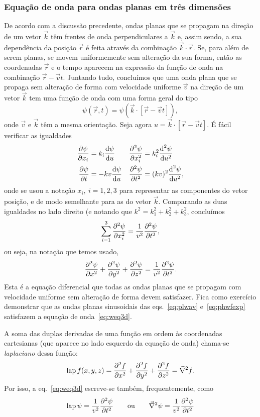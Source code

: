 \subsubsection{Equação de onda para ondas planas em três dimensões}
De acordo com a discussão precedente, ondas planas que se propagam na direção de
um vetor $\vec k$ têm frentes de onda perpendiculares a $\vec k$ e, assim sendo,
a sua dependência da posição $\vec r$ é feita através da combinação $\vec
k\cdot\vec r$. Se, para além de serem planas, se movem uniformemente sem
alteração da sua forma, então as coordenadas $\vec r$ e o tempo aparecem na
expressão da função de onda na combinação $\vec r-\vec vt$. Juntando tudo,
concluímos que uma onda plana que se propaga sem alteração de forma com
velocidade uniforme $\vec v$ na direção de um vetor $\vec k$ tem uma função de
onda com uma forma geral do tipo
\begin{equation}\label{eq:gpwwf}
  \psi(\vec r,t)=\psi\left(\vec k\cdot[\vec r-\vec vt]\right),
\end{equation}
onde $\vec v$ e $\vec k$ têm a mesma orientação. Seja agora $u=\vec k\cdot[\vec
r-\vec vt]$. É fácil verificar as igualdades
\begin{align*}
  \frac{\partial \psi}{\partial x_i}&=k_i\frac{\text{d} \psi}{\text{d} u}&
  \frac{\partial^2 \psi}{\partial x_i^2}&=k_i^2\frac{\text{d}^2 \psi}{\text{d} u^2}\\
  \frac{\partial \psi}{\partial t}&=-kv\frac{\text{d} \psi}{\text{d} u}&
  \frac{\partial^2 \psi}{\partial t^2}&=(kv)^2\frac{\text{d}^2 \psi}{\text{d} u^2},
\end{align*}
onde se usou a notação $x_i,\ i=1,2,3$ para representar as componentes do vetor
posição, e de modo semelhante para as do vetor $\vec k$. Comparando as duas
igualdades no lado direito (e notando que $k^2=k_1^2+k_2^2+k_3^2$, concluímos
\begin{equation*}
  \sum_{i=1}^3\frac{\partial^2 \psi}{\partial x_i^2}=\frac{1}{v^2}\frac{\partial^2 \psi}{\partial t^2},
\end{equation*}
ou seja, na notação que temos usado,
\begin{equation}\label{eq:weq3d}
  \frac{\partial^2 \psi}{\partial x^2}+\frac{\partial^2 \psi}{\partial y^2}+\frac{\partial^2 \psi}{\partial z^2}=\frac{1}{v^2}\frac{\partial^2 \psi}{\partial t^2}.
\end{equation}
Esta é a equação diferencial que todas as ondas planas que se propagam com
velocidade uniforme sem alteração de forma devem satisfazer. Fica como exercício
demonstrar que as ondas planas sinusoidais das eqs.~\eqref{eq:plwav}
e~\eqref{eq:phwfexp} satisfazem a equação de onda~\eqref{eq:weq3d}.

A soma das duplas derivadas de uma função em ordem às coordenadas cartesianas
(que aparece no lado esquerdo da equação de onda) chama-se \emph{laplaciano}
dessa função:
\begin{equation*}
  \lap f(x,y,z)=\pdd{f}{x}+\pdd{f}{y}+\pdd{f}{z} = \vec\nabla^2 f.
\end{equation*}
Por isso, a eq.~\eqref{eq:weq3d} escreve-se também, frequentemente, como
\begin{equation}\label{eq:plweq3d}
  \lap \psi=\frac{1}{v^2}\pdd{\psi}{t}\qquad\text{ou}\qquad
  \vec\nabla^2\psi=
  \frac{1}{v^2}\pdd{\psi}{t}
\end{equation}



